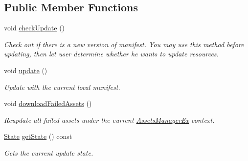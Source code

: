 \subsection*{Public Member Functions}
\begin{DoxyCompactItemize}
\item 
\mbox{\label{classAssetsManagerEx_a6f9f8da1b4719cf6a8a0482ef50bfe0f}} 
void \hyperlink{classAssetsManagerEx_a6f9f8da1b4719cf6a8a0482ef50bfe0f}{check\+Update} ()
\begin{DoxyCompactList}\small\item\em Check out if there is a new version of manifest. You may use this method before updating, then let user determine whether he wants to update resources. \end{DoxyCompactList}\item 
\mbox{\label{classAssetsManagerEx_a4e45b523a7f2d546f6f4bfe57401dcbf}} 
void \hyperlink{classAssetsManagerEx_a4e45b523a7f2d546f6f4bfe57401dcbf}{update} ()
\begin{DoxyCompactList}\small\item\em Update with the current local manifest. \end{DoxyCompactList}\item 
\mbox{\label{classAssetsManagerEx_a7e88b604c6cb16e3382ee7126339966c}} 
void \hyperlink{classAssetsManagerEx_a7e88b604c6cb16e3382ee7126339966c}{download\+Failed\+Assets} ()
\begin{DoxyCompactList}\small\item\em Reupdate all failed assets under the current \hyperlink{classAssetsManagerEx}{Assets\+Manager\+Ex} context. \end{DoxyCompactList}\item 
\mbox{\label{classAssetsManagerEx_a5fc14a86a1ed5f148beaddefbaf464bf}} 
\hyperlink{classAssetsManagerEx_a50ac8909632de66eb71eb69fa66229c3}{State} \hyperlink{classAssetsManagerEx_a5fc14a86a1ed5f148beaddefbaf464bf}{get\+State} () const
\begin{DoxyCompactList}\small\item\em Gets the current update state. \end{DoxyCompactList}\item 
\mbox{\label{classAssetsManagerEx_af80e1a94a8c5c90958d53d90c573d159}} 

\end{DoxyCompactItemize}

